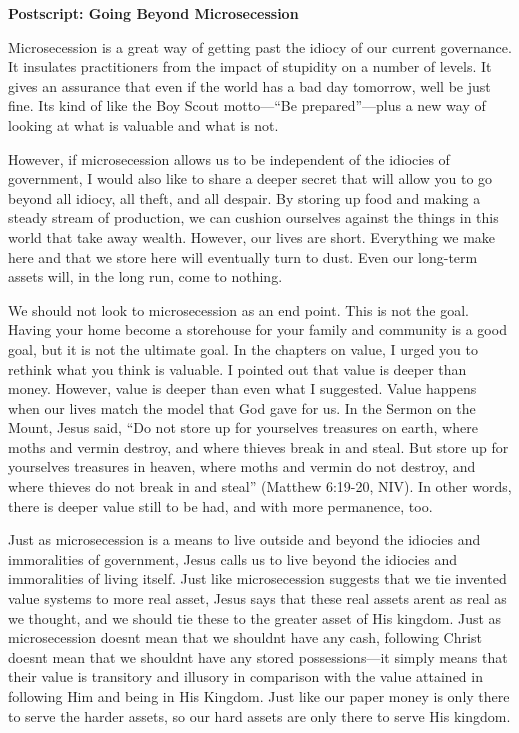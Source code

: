 \documentclass[letterpaper]{article}
\title{}
\begin{document}
\clearpage\setcounter{page}{1}\pagestyle{Standard}
{\centering{}\bfseries\color{black}
Postscript: Going Beyond Microsecession
\par}

{\color{black}
Microsecession is a great way of getting past the idiocy of our current
governance. It insulates practitioners from the impact of stupidity on
a number of levels. It gives an assurance that even if the world has a
bad day tomorrow, we{\textquotesingle}ll be just fine.
It{\textquotesingle}s kind of like the Boy Scout motto—“Be
prepared”—plus a new way of looking at what is valuable and what is
not.}

{\color{black}
However, if microsecession allows us to be independent of the idiocies
of government, I would also like to share a deeper secret that
\textcolor[rgb]{0.32941177,0.5529412,0.83137256}{will allow} you to go
beyond all idiocy, all theft, and all despair.  By storing up food and
making a steady stream of production, we can cushion ourselves against
the things in this world that take away wealth. However, our lives are
short. Everything we make here and that we store here will eventually
turn to dust. Even our long-term assets will, in the long run, come to
nothing.}

{\color{black}
We should not look to microsecession as an end point. This is not the
goal. Having your home become a storehouse for your family and
community is a good goal, but it is not the ultimate goal. In the
chapters on value, I urged you to rethink what you think is valuable. I
pointed out that value is deeper than money. However, value is deeper
than even what I suggested. Value happens when our lives match the
model that God gave for us. In the Sermon on the Mount, Jesus said, “Do
not store up for yourselves treasures on earth, where moths and vermin
destroy, and where thieves break in and steal. But store up for
yourselves treasures in heaven, where moths and vermin do not destroy,
and where thieves do not break in and steal” (Matthew 6:19-20, NIV). In
other words, there is deeper value still to be had, and with more
permanence, too.}

{\color{black}
Just as microsecession is a means to live outside and beyond the
idiocies and immoralities of government, Jesus calls us to live beyond
the idiocies and immoralities of living itself. Just like
microsecession suggests that we tie invented value systems to more real
asset, Jesus says that these real assets aren{\textquotesingle}t as
real as we thought, and we should tie these to the greater asset of His
kingdom. Just as microsecession doesn{\textquotesingle}t mean that we
shouldn{\textquotesingle}t have any cash, following Christ
doesn{\textquotesingle}t mean that we shouldn{\textquotesingle}t have
any stored possessions—it simply means that their value is transitory
and illusory in comparison with the value attained in following
\textcolor[rgb]{0.32941177,0.5529412,0.83137256}{Him and being in His
Kingdom.} Just like our paper money is only there to serve the harder
assets, so our hard assets are only there to serve His kingdom.}
\end{document}
